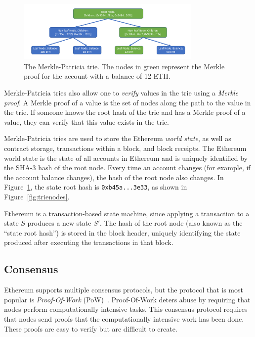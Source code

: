 \documentclass[12pt]{article}
\newcounter{protocol}
\newcommand{\figurewidth}{0.8\textwidth}
\begin{document}
\begin{figure}[H]
  \centering
  \includegraphics[width=\figurewidth]{../figures/background/trie/tree_with_merkle_proof.pdf}
  \caption{The Merkle-Patricia trie. The nodes in green represent the Merkle proof for the account with a balance of 12 ETH.} \label{fig:trie}
\end{figure}

Merkle-Patricia tries also allow one to \emph{verify} values in the trie using a \emph{Merkle proof}. A Merkle proof of a value is the set of nodes along the path to the value in the trie. If someone knows the root hash of the trie and has a Merkle proof of a value, they can verify that this value exists in the trie.


Merkle-Patricia tries are used to store the Ethereum \emph{world state}, as well as contract storage, transactions within a block, and block receipts. The Ethereum world state is the state of all accounts in Ethereum and is uniquely identified by the SHA-3 hash of the root node. Every time an account changes (for example, if the account balance changes), the hash of the root node also changes. In Figure~\ref{fig:trie}, the state root hash is \texttt{0xb45a...3e33}, as shown in Figure~\ref{fig:trienodes}.

Ethereum is a transaction-based state machine, since applying a transaction to a state $S$ produces a new state $S'$. The hash of the root node (also known as the ``state root hash'') is stored in the block header, uniquely identifying the state produced after executing the transactions in that block.


\subsection{Consensus} \label{subsection:consensus}
Ethereum supports multiple consensus protocols, but the protocol that is most popular is \emph{Proof-Of-Work} (PoW)~\cite{bitcoin-whitepaper}. Proof-Of-Work deters abuse by requiring that nodes perform computationally intensive tasks. This consensus protocol requires that nodes send proofs that the computationally intensive work has been done. These proofs are easy to verify but are difficult to create.
\end{document}
